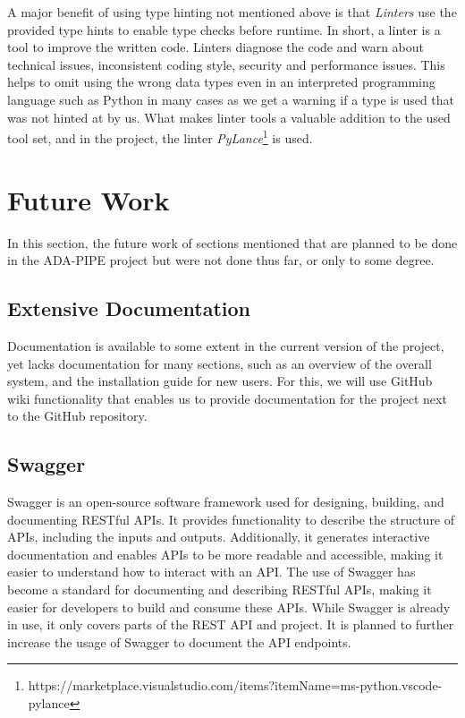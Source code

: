 \documentclass{article}
\begin{document}
        A major benefit of using type hinting not mentioned above is that \emph{Linters} use the provided type hints to enable type checks before runtime. 
        In short, a linter is a tool to improve the written code. Linters diagnose the code and warn about technical issues, inconsistent coding style, security and performance issues. This helps to omit using the wrong data types even in an interpreted programming language such as Python in many cases as we get a warning if a type is used that was not hinted at by us.
        What makes linter tools a valuable addition to the used tool set, and in the project, the linter \emph{PyLance}\footnote{https://marketplace.visualstudio.com/items?itemName=ms-python.vscode-pylance} is used. 

        
    \section{Future Work}
    \label{sec:future-work}

        In this section, the future work of sections mentioned that are planned to be done in the ADA-PIPE project but were not done thus far, or only to some degree.

        \subsection{Extensive Documentation}

            Documentation is available to some extent in the current version of the project, yet lacks documentation for many sections, such as an overview of the overall system, and the installation guide for new users.
            For this, we will use GitHub wiki functionality that enables us to provide documentation for the project next to the GitHub repository.
            
        \subsection{Swagger}
             
            Swagger is an open-source software framework used for designing, building, and documenting RESTful APIs.
            It provides functionality to describe the structure of APIs, including the inputs and outputs. Additionally, it generates interactive documentation and enables APIs to be more readable and accessible, making it easier to understand how to interact with an API.
            The use of Swagger has become a standard for documenting and describing RESTful APIs, making it easier for developers to build and consume these APIs.
            While Swagger is already in use, it only covers parts of the REST API and project.
            It is planned to further increase the usage of Swagger to document the API endpoints.
        
\end{document}

